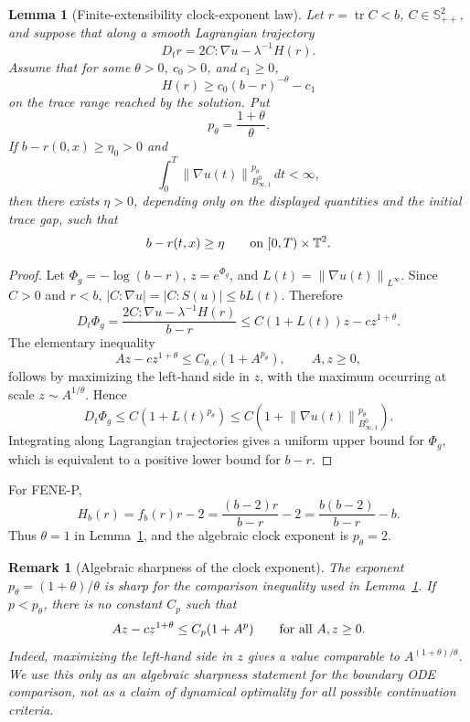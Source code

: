 \documentclass[11pt]{article}
\newtheorem{lemma}{Lemma}[section]
\newtheorem{remark}{Remark}[section]
\newcommand{\T}{\mathbb T}
\newcommand{\Spp}{\mathbb S_{++}}
\newcommand{\tr}{\operatorname{tr}}
\newcommand{\norm}[1]{\left\lVert #1\right\rVert}
\begin{document}
\begin{lemma}[Finite-extensibility clock-exponent law]
\label{lem:finite-extensibility-clock-exponent}
Let \(r=\tr C<b\), \(C\in\Spp^2\), and suppose that along a smooth
Lagrangian trajectory
\[
  D_t r=2C:\nabla u-\lambda^{-1}H(r).
\]
Assume that for some \(\theta>0\), \(c_0>0\), and \(c_1\ge0\),
\[
  H(r)\ge c_0(b-r)^{-\theta}-c_1
\]
on the trace range reached by the solution.  Put
\[
  p_\theta=\frac{1+\theta}{\theta}.
\]
If \(b-r(0,x)\ge\eta_0>0\) and
\[
  \int_0^T\norm{\nabla u(t)}_{B^0_{\infty,1}}^{p_\theta}\,dt<\infty,
\]
then there exists \(\eta>0\), depending only on the displayed quantities and
the initial trace gap, such that
\[
  b-r(t,x)\ge\eta
  \qquad\hbox{on }[0,T)\times\T^2 .
\]
\end{lemma}

\begin{proof}
Let \(\Phi_g=-\log(b-r)\), \(z=e^{\Phi_g}\), and
\(L(t)=\norm{\nabla u(t)}_{L^\infty}\).  Since \(C>0\) and \(r<b\),
\(|C:\nabla u|=|C:S(u)|\le bL(t)\).  Therefore
\[
  D_t\Phi_g
  =
  \frac{2C:\nabla u-\lambda^{-1}H(r)}{b-r}
  \le C(1+L(t))z-cz^{1+\theta}.
\]
The elementary inequality
\[
  Az-cz^{1+\theta}\le C_{\theta,c}(1+A^{p_\theta}),
  \qquad A,z\ge0,
\]
follows by maximizing the left-hand side in \(z\), with the maximum occurring
at scale \(z\sim A^{1/\theta}\).  Hence
\[
  D_t\Phi_g
  \le C\left(1+L(t)^{p_\theta}\right)
  \le C\left(1+\norm{\nabla u(t)}_{B^0_{\infty,1}}^{p_\theta}\right).
\]
Integrating along Lagrangian trajectories gives a uniform upper bound for
\(\Phi_g\), which is equivalent to a positive lower bound for \(b-r\).
\end{proof}

For FENE-P,
\[
  H_b(r)=f_b(r)r-2=\frac{(b-2)r}{b-r}-2
  =\frac{b(b-2)}{b-r}-b .
\]
Thus \(\theta=1\) in Lemma~\ref{lem:finite-extensibility-clock-exponent}, and
the algebraic clock exponent is \(p_\theta=2\).

\begin{remark}[Algebraic sharpness of the clock exponent]
The exponent \(p_\theta=(1+\theta)/\theta\) is sharp for the comparison
inequality used in Lemma~\ref{lem:finite-extensibility-clock-exponent}.  If
\(p<p_\theta\), there is no constant \(C_p\) such that
\[
  Az-cz^{1+\theta}\le C_p(1+A^p)
  \qquad\hbox{for all }A,z\ge0 .
\]
Indeed, maximizing the left-hand side in \(z\) gives a value comparable to
\(A^{(1+\theta)/\theta}\).  We use this only as an algebraic sharpness
statement for the boundary ODE comparison, not as a claim of dynamical
optimality for all possible continuation criteria.
\end{remark}
\end{document}

